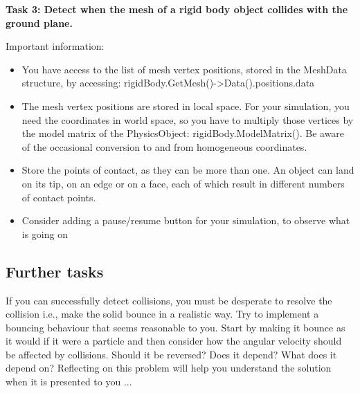 \documentclass[12pt]{article}
\begin{document}
\textbf{Task 3: Detect when the mesh of a rigid body object collides with the ground plane.}

Important information:

\begin{itemize}
\item You have access to the list of mesh vertex positions, stored in the MeshData structure, by accessing: rigidBody.GetMesh()->Data().positions.data
\item The mesh vertex positions are stored in local space. For your simulation, you need the coordinates in world space, so you have to multiply those vertices by the model matrix of the PhysicsObject: rigidBody.ModelMatrix(). Be aware of the occasional conversion to and from homogeneous coordinates.
\item Store the points of contact, as they can be more than one. An object can land on its tip, on an edge or on a face, each of which result in different numbers of contact points.
\item Consider adding a pause/resume button for your simulation, to observe what is going on
\end{itemize}

\subsection*{Further tasks}

If you can successfully detect collisions, you must be desperate to resolve the collision i.e., make the solid bounce in a realistic way. Try to implement a bouncing behaviour that seems reasonable to you. Start by making it bounce as it would if it were a particle and then consider how the angular velocity should be affected by collisions. Should it be reversed? Does it depend? What does it depend on? Reflecting on this problem will help you understand the solution when it is presented to you ...


\end{document}
